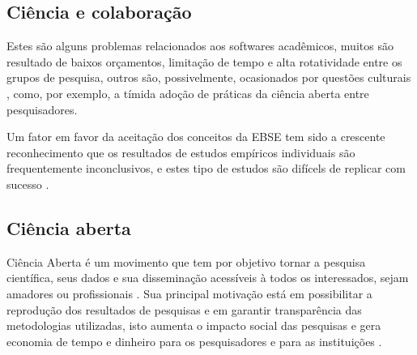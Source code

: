 



\subsection{Ciência e colaboração}


Estes são alguns problemas relacionados aos softwares acadêmicos, muitos são
resultado de baixos orçamentos, limitação de tempo e alta rotatividade entre os
grupos de pesquisa, outros são, possivelmente, ocasionados por questões
culturais \cite{niemeyer2017open}, como, por exemplo, a tímida adoção de
práticas da ciência aberta entre pesquisadores.

Um fator em favor da aceitação dos conceitos da EBSE tem sido a crescente
reconhecimento que os resultados de estudos empíricos individuais são frequentemente
inconclusivos, e estes tipo de estudos são difícels de replicar com sucesso
\cite{sjoberg2005survey}.

\subsection{Ciência aberta}

Ciência Aberta é um movimento que tem por objetivo tornar a pesquisa
científica, seus dados e sua disseminação acessíveis à todos os interessados,
sejam amadores ou profissionais \cite{WikipediaOpenScience}. Sua principal
motivação está em possibilitar a reprodução dos resultados de pesquisas e em
garantir transparência das metodologias utilizadas, isto aumenta o impacto
social das pesquisas e gera economia de tempo e dinheiro para os pesquisadores
e para as instituições \cite{nesta2010open}.

